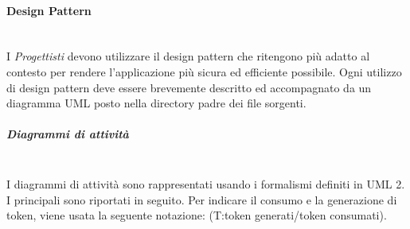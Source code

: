 \paragraph{Design Pattern}\mbox{}\\
I \textit{Progettisti} devono utilizzare il design pattern che ritengono più adatto al contesto per rendere l'applicazione più sicura ed efficiente possibile.
Ogni utilizzo di design pattern deve essere brevemente descritto ed accompagnato da un diagramma UML posto nella directory padre dei file sorgenti.

\subparagraph{Diagrammi di attività}\mbox{}\\
I diagrammi di attività sono rappresentati usando i formalismi definiti in UML 2. I principali sono riportati in seguito. Per indicare il consumo e la generazione di token, viene usata la seguente notazione: (T:token generati/token consumati).
